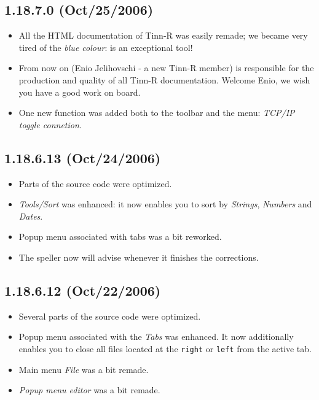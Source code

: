 \subsection*{1.18.7.0 (Oct/25/2006)}
\begin{itemize}
  \item All the HTML documentation of Tinn-R was easily remade; we became
    very tired of the \textit{blue colour}:
    is an exceptional tool!
  \item From now on (Enio Jelihovschi - a new Tinn-R member) is 
    responsible for the production and quality of all Tinn-R documentation.
    Welcome Enio, we wish you have a good work on board.
  \item One new function was added both to the \RR{} toolbar and the \RR{}
    menu: \textit{TCP/IP toggle connetion}.
\end{itemize}


\subsection*{1.18.6.13 (Oct/24/2006)}
\begin{itemize}
  \item Parts of the source code were optimized.
  \item \textit{Tools/Sort} was enhanced: it now enables you to sort by
    \textit{Strings}, \textit{Numbers} and \textit{Dates}.
  \item Popup menu associated with tabs was a bit reworked.
  \item The speller now will advise whenever it finishes the
    corrections.
\end{itemize}


\subsection*{1.18.6.12 (Oct/22/2006)}
\begin{itemize}
  \item Several parts of the source code were optimized.
  \item Popup menu associated with the \textit{Tabs} was enhanced. It now
    additionally enables you to close all files located at the \texttt{right}
    or \texttt{left} from the active tab.
  \item Main menu \textit{File} was a bit remade.
  \item \textit{Popup menu editor} was a bit remade.
\end{itemize}


